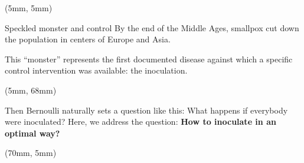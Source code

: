 \begin{frame}{}
    \begin{textblock*}{55mm}(5mm, 5mm)
        \begin{beamerboxesrounded}{Speckled monster and control}
                By the end of the Middle Ages, smallpox cut down the
            population in centers of Europe and Asia.

                This  ``monster'' represents the first documented
            disease against which a specific control intervention was
            available: the inoculation.
        \end{beamerboxesrounded}
    \end{textblock*}
%
    \begin{textblock*}{115mm}(5mm, 68mm)
        \begin{beamerboxesrounded}{}
            Then Bernoulli naturally sets a question like this: What
            happens if everybody were inoculated? Here, we address the
            question: \textbf{How to  inoculate in an optimal way?}
        \end{beamerboxesrounded}
    \end{textblock*}
%
    \begin{textblock*}{60mm}(70mm, 5mm)
        \begin{bibunit}[apalike]
            \nocite{bradley1971smallpox, Foppa2017}
            \putbib
        \end{bibunit}
    \end{textblock*}
\end{frame}
%
